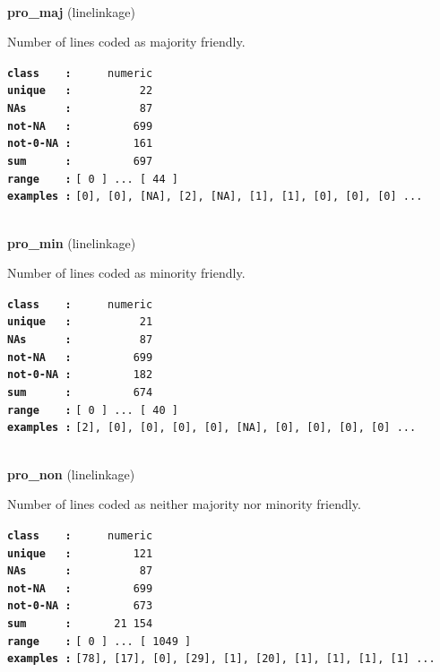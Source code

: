 \documentclass[]{article}
\begin{document}
~

\textbf{pro\_maj} (linelinkage)

Number of lines coded as majority friendly.

\textbf{\texttt{class\ \ \ \ :}} \texttt{~~~~~numeric}\\
\textbf{\texttt{unique\ \ \ :}} \texttt{~~~~~~~~~~22}\\
\textbf{\texttt{NAs\ \ \ \ \ \ :}} \texttt{~~~~~~~~~~87}\\
\textbf{\texttt{not-NA\ \ \ :}} \texttt{~~~~~~~~~699}\\
\textbf{\texttt{not-0-NA\ :}} \texttt{~~~~~~~~~161}\\
\textbf{\texttt{sum\ \ \ \ \ \ :}} \texttt{~~~~~~~~~697}\\
\textbf{\texttt{range\ \ \ \ :}}
\texttt{{[}\ 0\ {]}\ ...\ {[}\ 44\ {]}}\\
\textbf{\texttt{examples\ :}}
\texttt{{[}0{]},\ {[}0{]},\ {[}NA{]},\ {[}2{]},\ {[}NA{]},\ {[}1{]},\ {[}1{]},\ {[}0{]},\ {[}0{]},\ {[}0{]}\ ...}\\

~

\textbf{pro\_min} (linelinkage)

Number of lines coded as minority friendly.

\textbf{\texttt{class\ \ \ \ :}} \texttt{~~~~~numeric}\\
\textbf{\texttt{unique\ \ \ :}} \texttt{~~~~~~~~~~21}\\
\textbf{\texttt{NAs\ \ \ \ \ \ :}} \texttt{~~~~~~~~~~87}\\
\textbf{\texttt{not-NA\ \ \ :}} \texttt{~~~~~~~~~699}\\
\textbf{\texttt{not-0-NA\ :}} \texttt{~~~~~~~~~182}\\
\textbf{\texttt{sum\ \ \ \ \ \ :}} \texttt{~~~~~~~~~674}\\
\textbf{\texttt{range\ \ \ \ :}}
\texttt{{[}\ 0\ {]}\ ...\ {[}\ 40\ {]}}\\
\textbf{\texttt{examples\ :}}
\texttt{{[}2{]},\ {[}0{]},\ {[}0{]},\ {[}0{]},\ {[}0{]},\ {[}NA{]},\ {[}0{]},\ {[}0{]},\ {[}0{]},\ {[}0{]}\ ...}\\

~

\textbf{pro\_non} (linelinkage)

Number of lines coded as neither majority nor minority friendly.

\textbf{\texttt{class\ \ \ \ :}} \texttt{~~~~~numeric}\\
\textbf{\texttt{unique\ \ \ :}} \texttt{~~~~~~~~~121}\\
\textbf{\texttt{NAs\ \ \ \ \ \ :}} \texttt{~~~~~~~~~~87}\\
\textbf{\texttt{not-NA\ \ \ :}} \texttt{~~~~~~~~~699}\\
\textbf{\texttt{not-0-NA\ :}} \texttt{~~~~~~~~~673}\\
\textbf{\texttt{sum\ \ \ \ \ \ :}} \texttt{~~~~~~21~154}\\
\textbf{\texttt{range\ \ \ \ :}}
\texttt{{[}\ 0\ {]}\ ...\ {[}\ 1049\ {]}}\\
\textbf{\texttt{examples\ :}}
\texttt{{[}78{]},\ {[}17{]},\ {[}0{]},\ {[}29{]},\ {[}1{]},\ {[}20{]},\ {[}1{]},\ {[}1{]},\ {[}1{]},\ {[}1{]}\ ...}\\
\end{document}
